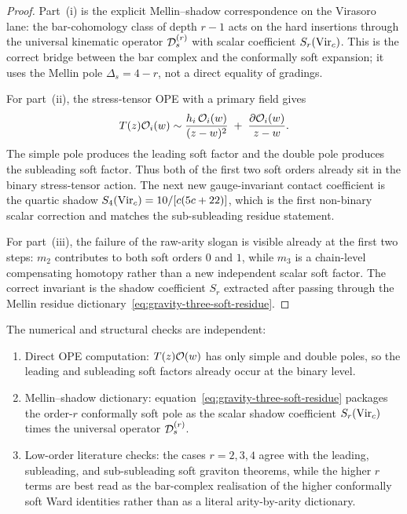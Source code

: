 \begin{proof}
Part~(i) is the explicit Mellin--shadow correspondence on the Virasoro
lane: the bar-cohomology class of depth $r-1$ acts on the hard
insertions through the universal kinematic operator $\mathcal D_s^{(r)}$ with
scalar coefficient $S_r(\mathrm{Vir}_c)$. This is the correct bridge between
the bar complex and the conformally soft expansion; it uses the Mellin
pole $\Delta_s = 4-r$, not a direct equality of gradings.

For part~(ii), the stress-tensor OPE with a primary field gives
\[
T(z)\mathcal O_i(w)
\sim
\frac{h_i\,\mathcal O_i(w)}{(z-w)^2}
\;+\;
\frac{\partial\mathcal O_i(w)}{z-w}.
\]
The simple pole produces the leading soft factor and the double pole
produces the subleading soft factor. Thus both of the first two soft
orders already sit in the binary stress-tensor action. The next new
gauge-invariant contact coefficient is the quartic shadow
$S_4(\mathrm{Vir}_c)=10/[c(5c+22)]$, which is the first non-binary scalar
correction and matches the sub-subleading residue statement.

For part~(iii), the failure of the raw-arity slogan is visible already
at the first two steps: $m_2$ contributes to both soft orders
$0$ and $1$, while $m_3$ is a chain-level compensating homotopy rather
than a new independent scalar soft factor. The correct invariant is the
shadow coefficient $S_r$ extracted after passing through the Mellin
residue dictionary~\eqref{eq:gravity-three-soft-residue}.
\end{proof}

\begin{remark}
\label{rem:gravity-three-soft-verification}
The numerical and structural checks are independent:
\begin{enumerate}[label=\textup{(\Alph*)}]
\item Direct OPE computation:
$T(z)\mathcal O(w)$ has only simple and double poles, so the leading and
subleading soft factors already occur at the binary level.
\item Mellin--shadow dictionary:
equation~\eqref{eq:gravity-three-soft-residue} packages the order-$r$
conformally soft pole as the scalar shadow coefficient $S_r(\mathrm{Vir}_c)$
times the universal operator $\mathcal D_s^{(r)}$.
\item Low-order literature checks:
the cases $r=2,3,4$ agree with the leading, subleading, and
sub-subleading soft graviton theorems, while the higher $r$ terms are
best read as the bar-complex realisation of the higher conformally soft
Ward identities rather than as a literal arity-by-arity dictionary.
\end{enumerate}
\end{remark}

